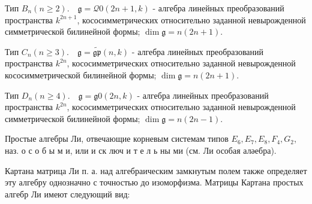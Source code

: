 \documentclass[10pt]{article}
\begin{document}
Тип $B_{n}(n \geqslant 2) . \quad \mathfrak{g}=\mathcal{Q} \mathfrak{0}(2 n+1, k)$ - алгебра линейных преобразований пространства $k^{2 n+1}$, кососимметрических относительно заданной невырожденной симметрической билинейной формы; $\operatorname{dim} \mathfrak{g}=n(2 n+1)$.



Тип $C_{n}(n \geqslant 3) . \quad \mathfrak{g}=\tilde{\mathfrak{g} \mathfrak{p}}(n, k)$ - алгебра линейных преобразований пространства $k^{2 n}$, кососимметрических относительно заданной невырожденной кососимметрической билинейной формы; $\operatorname{dim} \mathfrak{g}=n(2 n+1)$.



Тип $D_{n}(n \geqslant 4) . \quad \mathfrak{g}=\mathfrak{g 0}(2 n, k)$ - алгебра линейных преобразований пространства $k^{2 n}$, кососимметрических относительно заданной невырожденной симметрической билинейной формы; $\operatorname{dim} \mathfrak{g}=n(2 n-1)$.



Простые алгебры Ли, отвечающие корневым системам типов $E_{6}, E_{7}, E_{8}, F_{4}, G_{2}$, наз. о с о б ы м и, или и ск люч и т е л ь ны ми (см. Ли особая аләебра).



Картана матрица Ли п. а. над алгебраическим замкнутым полем также определяет эту алгебру однозначно с точностью до изоморфизма. Матрицы Картана простых алгебр Ли имеют следующий вид:
\end{document}
